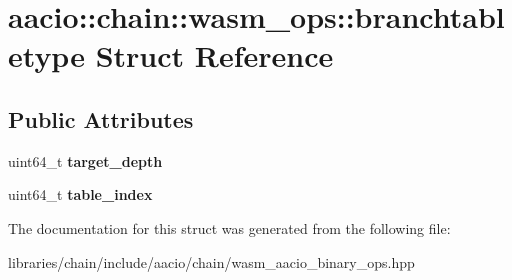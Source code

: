 \hypertarget{structaacio_1_1chain_1_1wasm__ops_1_1branchtabletype}{}\section{aacio\+:\+:chain\+:\+:wasm\+\_\+ops\+:\+:branchtabletype Struct Reference}
\label{structaacio_1_1chain_1_1wasm__ops_1_1branchtabletype}
\subsection*{Public Attributes}
\begin{DoxyCompactItemize}
\item 
\mbox{\label{structaacio_1_1chain_1_1wasm__ops_1_1branchtabletype_ad0e65ea466decf9874fe4928aaa47153}} 
uint64\+\_\+t {\bfseries target\+\_\+depth}
\item 
\mbox{\label{structaacio_1_1chain_1_1wasm__ops_1_1branchtabletype_aa75f6ff3be4cd1d72bcb5d90c09c880a}} 
uint64\+\_\+t {\bfseries table\+\_\+index}
\end{DoxyCompactItemize}


The documentation for this struct was generated from the following file\+:\begin{DoxyCompactItemize}
\item 
libraries/chain/include/aacio/chain/wasm\+\_\+aacio\+\_\+binary\+\_\+ops.\+hpp\end{DoxyCompactItemize}
